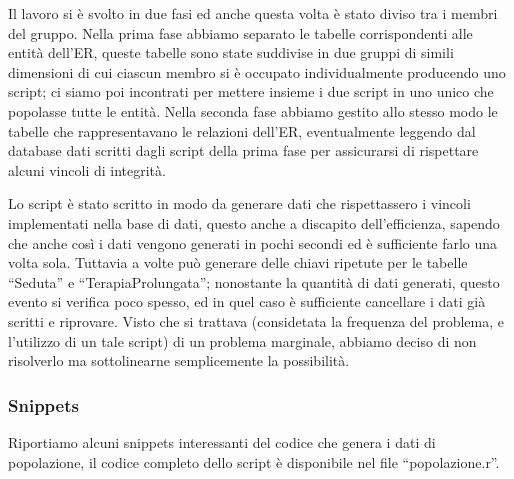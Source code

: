 \documentclass[11pt]{article}
\begin{document}
Il lavoro si è svolto in due fasi ed anche questa volta è stato diviso tra i membri del gruppo. Nella prima fase abbiamo separato le tabelle corrispondenti alle entità dell'ER, queste tabelle sono state suddivise in due gruppi di simili dimensioni di cui ciascun membro si è occupato individualmente producendo uno script; ci siamo poi incontrati per mettere insieme i due script in uno unico che popolasse tutte le entità.
Nella seconda fase abbiamo gestito allo stesso modo le tabelle che rappresentavano le relazioni dell'ER, eventualmente leggendo dal database dati scritti dagli script della prima fase per assicurarsi di rispettare alcuni vincoli di integrità.

Lo script è stato scritto in modo da generare dati che rispettassero i vincoli implementati nella base di dati, questo anche a discapito dell'efficienza, sapendo che anche così i dati vengono generati in pochi secondi ed è sufficiente farlo una volta sola.
Tuttavia a volte può generare delle chiavi ripetute per le tabelle ``Seduta'' e ``TerapiaProlungata''; nonostante la quantità di dati generati, questo evento si verifica poco spesso, ed in quel caso è sufficiente cancellare i dati già scritti e riprovare. Visto che si trattava (considetata la frequenza del problema, e l'utilizzo di un tale script) di un problema marginale, abbiamo deciso di non risolverlo ma sottolinearne semplicemente la possibilità.

\subsubsection{Snippets}
Riportiamo alcuni snippets interessanti del codice che genera i dati di popolazione, il codice completo dello script è disponibile nel file ``popolazione.r''.\\
\end{document}

